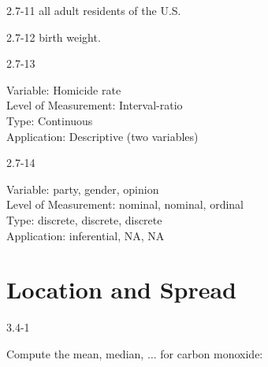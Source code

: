 \begin{exsol@solution}{2.7-11}
    all adult residents of the U.S.
\end{exsol@solution}
\begin{exsol@solution}{2.7-12}
    birth weight.
\end{exsol@solution}
\begin{exsol@solution}{2.7-13}

    Variable: Homicide rate \\
    Level of Measurement: Interval-ratio \\
    Type: Continuous \\
    Application: Descriptive (two variables)

\end{exsol@solution}
\begin{exsol@solution}{2.7-14}

    Variable: party, gender, opinion \\
    Level of Measurement: nominal, nominal, ordinal \\
    Type: discrete, discrete, discrete \\
    Application: inferential, NA, NA

\end{exsol@solution}
\setcounter{chapter}{3}\chapter{Location and Spread}
\begin{exsol@solution}{3.4-1}

	Compute the mean, median, $\dots$ for carbon monoxide:
\end{exsol@solution}
